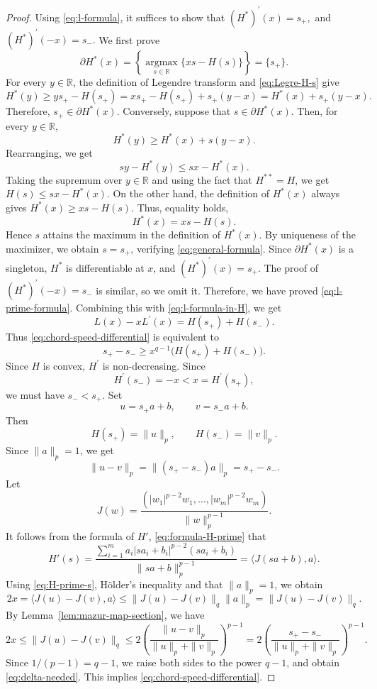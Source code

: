 \documentclass[11pt,a4paper]{amsart}
\theoremstyle{plain}
\theoremstyle{definition}
\begin{document}
\begin{proof}
Using \eqref{eq:l-formula}, it suffices to show that
$
    \left(H^*\right)^{\prime}(x)=s_{+}, $ and $\left(H^*\right)^{\prime}(-x)=s_{-} .
$
We first prove 
\begin{equation} \label{eq:general-formula}
    \partial H^*(x)=\left\{ \underset{s \in \mathbb{R}}{\operatorname{argmax}}\{x s-H(s)\} \right\}= \{s_+\}.
\end{equation}
For every $y \in \mathbb{R}$, the definition of Legendre transform and \eqref{eq:Legre-H-s} give
$$
H^*(y)  \geq y s_+-H(s_+) 
 =x s_+-H(s_+)+s_+(y-x) 
=H^*(x)+s_+(y-x).
$$
Therefore,  $s_+ \in \partial H^*(x)$. Conversely, suppose that $s \in \partial H^*(x)$. Then, for every $y \in \mathbb{R}$,
$$
H^*(y) \geq H^*(x)+s(y-x) .
$$
Rearranging, we get
$$
s y-H^*(y) \leq s x-H^*(x) .
$$
Taking the supremum over $y \in \mathbb{R}$ and using the fact that $H^{**} = H$, we get 
$
    H(s) \leq s x-H^*(x).
$
On the other hand, the definition of $H^*(x)$ always gives
$
H^*(x) \geq x s-H(s) .
$
Thus, equality holds,
\[
    H^*(x)=x s-H(s).
\]
Hence $s$ attains the maximum in the definition of $H^*(x)$. By uniqueness of the maximizer, we obtain $s=s_{+}$, verifying \eqref{eq:general-formula}.
Since $\partial H^*(x)$ is a singleton, $H^*$ is differentiable at $x$, and
$
\left(H^*\right)^{\prime}(x)=s_{+} .
$ 
The proof of $\left(H^*\right)^{\prime}(-x)=s_{-}$ is similar, so we omit it.
Therefore, we have proved \eqref{eq:l-prime-formula}. Combining this with \eqref{eq:l-formula-in-H}, we get
\[
    L(x)-x L^{\prime}(x)=H\left(s_{+}\right)+H\left(s_{-}\right).
\]
Thus \eqref{eq:chord-speed-differential} is equivalent to
\begin{equation}
\label{eq:delta-needed}
    s_+ - s_-\geq x^{q-1}\bigl(H(s_+)+H(s_-)\bigr).
\end{equation}
Since $H$ is convex, $H^{\prime}$ is non-decreasing. Since
$$
H^{\prime}\left(s_{-}\right)=-x<x=H^{\prime}\left(s_{+}\right),
$$
we must have
$
s_{-}<s_{+} .
$
Set
\[
    u=s_+a+b,
    \qquad
    v=s_-a+b.
\]
Then
\[
    H(s_+)=\|u\|_p,
    \qquad
    H(s_-)=\|v\|_p.
\]
Since $\|a\|_p=1$, we get
\[
    \|u-v\|_p=\|(s_+-s_-) a\|_p = s_+ -s_-.
\]
Let 
\[
    J(w)=\frac{(|w_1|^{p-2}w_1,\ldots,|w_m|^{p-2}w_m)}{\|w\|_p^{p-1}}.
\]
It follows from the formula of $H'$, \eqref{eq:formula-H-prime} that
\[
    H'(s)=\frac{\sum_{i=1}^m a_i\left|s a_i+b_i\right|^{p-2}\left(s a_i+b_i\right)}{\|s a+b\|_p^{p-1}} = \langle J(sa+b),a\rangle.
\]
Using \eqref{eq:H-prime-s}, H\"older's inequality and that $\|a\|_p=1$, we  obtain
\[
    2x=\langle J(u)-J(v),a\rangle
       \leq \|J(u)-J(v)\|_q\|a\|_p
       =\|J(u)-J(v)\|_q.
\]
By Lemma~\ref{lem:mazur-map-section}, we have
\[
    2x \leq \|J(u)-J(v)\|_q \leq 2\left(
       \frac{\|u-v\|_p}{\|u\|_p+\|v\|_p}
    \right)^{p-1} = 
    2\left(
       \frac{s_+-s_-}{\|u\|_p+\|v\|_p}
    \right)^{p-1}.
\]
Since $1/(p-1)=q-1$, we raise both sides to the power $q-1$, and obtain  \eqref{eq:delta-needed}. This implies \eqref{eq:chord-speed-differential}.
\end{proof}
\end{document}

